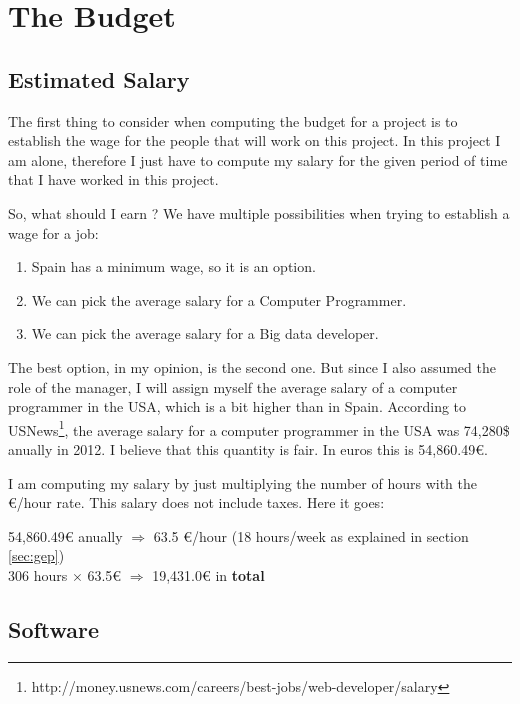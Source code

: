  
\section{The Budget}

\subsection{Estimated Salary}

The first thing to consider when computing the budget for a project is to
establish the wage for the people that will work on this project. In this
project I am alone, therefore I just have to compute my salary for the given
period of time that I have worked in this project.

So, what should I earn ? We have multiple possibilities when trying to
establish a wage for a job:

\begin{enumerate}
  \itemsep0em
  \item Spain has a minimum wage, so it is an option.
  \item We can pick the average salary for a Computer Programmer.
  \item We can pick the average salary for a Big data developer.
\end{enumerate}

The best option, in my opinion, is the second one. But since I also assumed the
role of the manager, I will assign myself the average salary of a computer
programmer in the USA, which is a bit higher than in Spain. According to
USNews\footnote{http://money.usnews.com/careers/best-jobs/web-developer/salary},
the average salary for a computer programmer in the USA was 74,280\$ anually in
2012. I believe that this quantity is fair. In euros this is 54,860.49\euro.

I am computing my salary by just multiplying the number of hours with the
\euro/hour rate. This salary does not include taxes. Here it goes:

\begin{center}
  54,860.49\euro{} anually $\Rightarrow$ 63.5 \euro/hour (18 hours/week as
explained in section \ref{sec:gep}) \\
  306 hours $\times$ 63.5\euro{} $\Rightarrow$ 19,431.0\euro{} in
{\bf total}
\end{center}

\subsection{Software}

